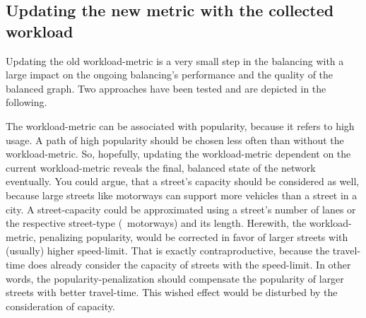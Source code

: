     \subsection{Updating the new metric with the collected workload}

        Updating the old workload-\gls{metric} is a very small step in the \gls{balancing} with a large impact on the ongoing \gls{balancing}'s performance and the quality of the balanced graph.
        Two approaches have been tested and are depicted in the following.

        The workload-\gls{metric} can be associated with popularity, because it refers to high usage.
        A path of high popularity should be chosen less often than without the workload-\gls{metric}.
        So, hopefully, updating the workload-\gls{metric} dependent on the current workload-\gls{metric} reveals the final, balanced state of the network eventually.
        You could argue, that a street's capacity should be considered as well, because large streets like motorways can support more vehicles than a street in a city.
        A street-capacity could be approximated using a street's number of lanes or the respective street-type (\eg\ motorways) and its length.
        Herewith, the workload-\gls{metric}, penalizing popularity, would be corrected in favor of larger streets with (usually) higher speed-limit.
        That is exactly contraproductive, because the travel-time does already consider the capacity of streets with the speed-limit.
        In other words, the popularity-penalization should compensate the popularity of larger streets with better travel-time.
        This wished effect would be disturbed by the consideration of capacity.

